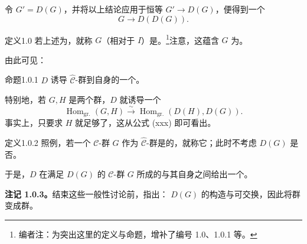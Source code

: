 令 $G'=D(G)$，并将以上结论应用于恒等 $G'\to D(G)$，便得到一个
\[
G\longrightarrow D(D(G)).\tag{xxxx}
\]
\begin{SGAresult}{定义}{1.0}
若上述为，就称 $G$（相对于 $I$）是。\footnote[2]{编者注：为突出这里的定义与命题，增补了编号 1.0、1.0.1 等。}注意，这蕴含 $G$ 为。
\end{SGAresult}
由此可见：
\begin{SGAresult}{命题}{1.0.1}
 $D$ 诱导 $\widehat{\mathcal C}$-群到自身的一个。
\end{SGAresult}
特别地，若 $G,H$ 是两个群，$D$ 就诱导一个
\[
\operatorname{Hom}_{\mathrm{gr.}}(G,H)\xrightarrow{\sim}
\operatorname{Hom}_{\mathrm{gr.}}(D(H),D(G)).
\]
事实上，只要求 $H$ 就足够了，这从公式 (xxx) 即可看出。
\begin{SGAresult}{定义}{1.0.2}
照例，若一个 $\mathcal C$-群 $G$ 作为 $\widehat{\mathcal C}$-群是的，就称它；此时不考虑 $D(G)$ 是否。
\end{SGAresult}
于是，$D$ 在满足 $D(G)$ 的 $\mathcal C$-群 $G$ 所成的与其自身之间给出一个。

\textbf{注记 1.0.3。}结束这些一般性讨论前，指出： $D(G)$ 的构造与可交换，因此将群变成群。

